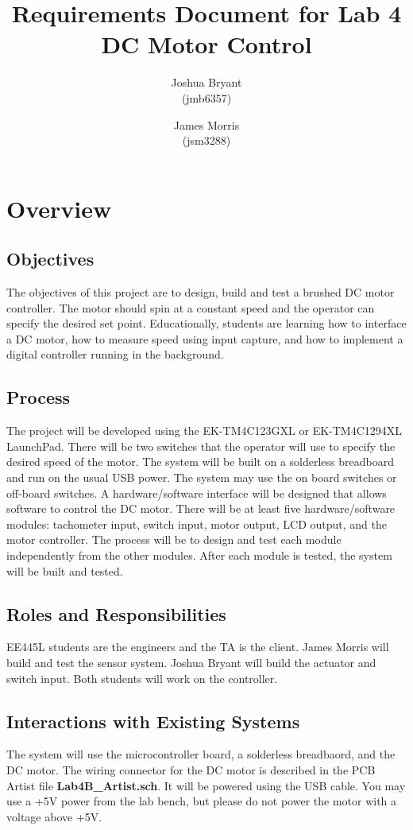 \documentclass{article}
\begin{document}
\title{Requirements Document for Lab 4 DC Motor Control}
\author{Joshua Bryant \\(jmb6357) \and James Morris \\(jsm3288)}

\maketitle

\section{Overview}

	\subsection{Objectives}
		The objectives of this project are to design, build and test a brushed DC motor controller. The motor should spin at a constant speed and the operator can specify the desired set point. Educationally, students are learning how to interface a DC motor, how to measure speed using input capture, and how to implement a digital controller running in the background.
	\subsection{Process}
		The project will be developed using the EK-TM4C123GXL or EK-TM4C1294XL LaunchPad. There will be two switches that the operator will use to specify  the desired speed of the motor. The system will be built on a solderless breadboard and run on the usual USB power. The system may use the on board switches or off-board switches. A hardware/software interface will be designed that allows software to control the DC motor. There will be at least five hardware/software modules: tachometer input, switch input, motor output, LCD output, and the motor controller. The process will be to design and test each module independently from the other modules. After each module is tested, the system will be built and tested.
	\subsection{Roles and Responsibilities}
		EE445L students are the engineers and the TA is the client. James Morris will build and test the sensor system. Joshua Bryant will build the actuator and switch input. Both students will work on the controller.
	\subsection{Interactions with Existing Systems}
		The system will use the microcontroller board, a solderless breadbaord, and the DC motor. The wiring connector for the DC motor is described in the PCB Artist file \textbf{Lab4B\_Artist.sch}. It will be powered using the USB cable. You may use a +5V power from the lab bench, but please do not power the motor with a voltage above +5V. 
\end{document}
